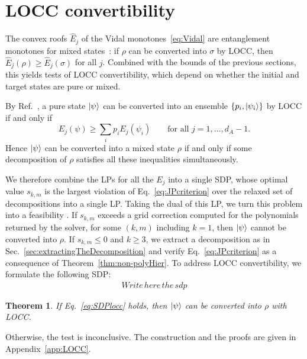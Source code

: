 \documentclass[aps,pra,twocolumn,showpacs,superscriptaddress,groupedaddress]{revtex4-2}
\newtheorem{theorem}    {Theorem}
\begin{document}



\section{LOCC convertibility}
The convex roofs $\widehat E_j$ of the Vidal monotones~\eqref{eq:Vidal} are entanglement monotones for mixed states~\cite{Vidal_2000}: if $\rho$ can be converted into $\sigma$ by LOCC, then $\widehat E_j(\rho)\geq\widehat E_j(\sigma)$ for all $j$. Combined with the bounds of the previous sections, this yields tests of LOCC convertibility, which depend on whether the initial and target states are pure or mixed.

By Ref.~\cite{Jonathan_1999}, a pure state $\ket{\psi}$ can be converted into an ensemble $\{p_i, \ket{\psi_i}\}$ by LOCC if and only if
\begin{equation}\label{eq:JPcriterion}
    E_j(\psi) \geq \sum_i p_i E_j(\psi_i)\qquad \text{for all } j=1,\dots,d_A-1.
\end{equation}
Hence $\ket{\psi}$ can be converted into a mixed state $\rho$ if and only if some decomposition of $\rho$ satisfies all these inequalities simultaneously.

We therefore combine the LPs for all the $E_j$ into a single SDP, whose optimal value $s_{k,m}$ is the largest violation of Eq.~\eqref{eq:JPcriterion} over the relaxed set of decompositions into a single LP. Taking the dual of this LP, we turn this problem into a feasibility . If $s_{k,m}$ exceeds a grid correction computed for the polynomials returned by the solver, for some $(k,m)$ including $k=1$, then $\ket{\psi}$ cannot be converted into $\rho$. If $s_{k,m}\leq0$ and $k\geq3$, we extract a decomposition as in Sec.~\ref{sec:extractingTheDecomposition} and verify Eq.~\eqref{eq:JPcriterion} as a consequence of Theorem~\ref{thm:non-polyHier}. To address LOCC convertibility, we formulate the following SDP:
\begin{align}
    Write\,here\,the\,sdp \label{eq:SDPlocc}
\end{align}
\begin{theorem}
    If Eq.~\eqref{eq:SDPlocc} holds, then $\ket{\psi}$ can be converted into $\rho$ with LOCC.
\end{theorem}
Otherwise, the test is inconclusive. The construction and the proofs are given in Appendix~\ref{app:LOCC}.




\iffalse
\end{document}
